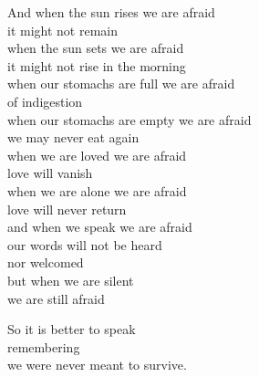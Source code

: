 \documentclass[12pt, openany, letterpaper]{memoir}
\begin{document}
\begin{minipage}[t]{0.45\linewidth}
	And when the sun rises we are afraid\\
	it might not remain\\
	when the sun sets we are afraid\\
	it might not rise in the morning\\
	when our stomachs are full we are afraid\\
	of indigestion\\
	when our stomachs are empty we are afraid\\
	we may never eat again\\
	when we are loved we are afraid\\
	love will vanish\\
	when we are alone we are afraid\\
	love will never return\\
	and when we speak we are afraid\\
	our words will not be heard\\
	nor welcomed\\
	but when we are silent\\
	we are still afraid

	So it is better to speak\\
	remembering\\
	we were never meant to survive.
\end{minipage}
\end{document}
